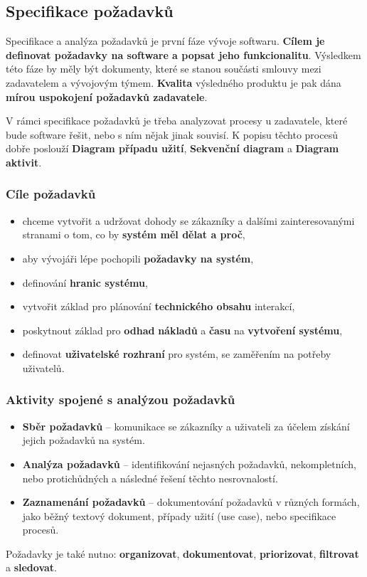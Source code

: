 \subsection{Specifikace požadavků}
Specifikace a analýza požadavků je první fáze vývoje softwaru. \textbf{Cílem je definovat požadavky na software a popsat jeho funkcionalitu}. Výsledkem této fáze by měly být dokumenty, které se stanou součásti smlouvy mezi zadavatelem a vývojovým týmem. \textbf{Kvalita} výsledného produktu je pak dána \textbf{mírou uspokojení požadavků zadavatele}.

V rámci specifikace požadavků je třeba analyzovat procesy u zadavatele, které bude software řešit, nebo s ním nějak jinak souvisí. K popisu těchto procesů dobře poslouží \textbf{Diagram případu užití}, \textbf{Sekvenční diagram} a \textbf{Diagram aktivit}.

\subsubsection{Cíle požadavků}
\begin{itemize}
\item chceme vytvořit a udržovat dohody se zákazníky a dalšími zainteresovanými stranami o tom, co by \textbf{systém měl dělat a proč},
\item aby vývojáři lépe pochopili \textbf{požadavky na systém},
\item definování \textbf{hranic systému},
\item vytvořit základ pro plánování \textbf{technického obsahu} interakcí,
\item poskytnout základ pro \textbf{odhad} \textbf{nákladů} a \textbf{času} na \textbf{vytvoření systému},
\item definovat \textbf{uživatelské rozhraní} pro systém, se zaměřením na potřeby uživatelů.
\end{itemize}

\subsubsection{Aktivity spojené s analýzou požadavků}
\begin{itemize}
	\item \textbf{Sběr požadavků} --  komunikace se zákazníky a uživateli za účelem získání jejich požadavků na systém.
	\item \textbf{Analýza požadavků} -- identifikování nejasných požadavků, nekompletních, nebo protichůdných a následné řešení těchto nesrovnalostí.
	\item \textbf{Zaznamenání požadavků} -- dokumentování požadavků v různých formách, jako běžný textový dokument, případy užití (use case), nebo specifikace procesů.
\end{itemize}
Požadavky je také nutno: \textbf{organizovat}, \textbf{dokumentovat}, \textbf{priorizovat}, \textbf{filtrovat} a \textbf{sledovat}.

